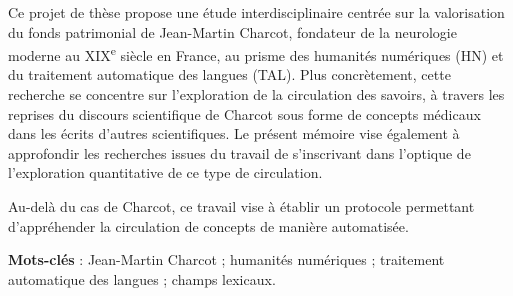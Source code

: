 
%

Ce projet de thèse propose une étude interdisciplinaire centrée sur la valorisation du fonds patrimonial de Jean-Martin Charcot, fondateur de la neurologie moderne au XIX\textsuperscript{e} siècle en France, au prisme des humanités numériques (\textsc{HN}) et du traitement automatique des langues (\textsc{TAL}). Plus concrètement, cette recherche se concentre sur l'exploration de la circulation des savoirs, à travers les reprises du discours scientifique de Charcot sous forme de concepts médicaux dans les écrits d'autres scientifiques. Le présent mémoire vise également à approfondir les recherches issues du travail de \citet{petkovic2023circulation} s'inscrivant dans l'optique de l'exploration quantitative de ce type de circulation. 


Au-delà du cas de Charcot, ce travail vise à établir un protocole permettant d'appréhender la circulation de concepts de manière automatisée.

\textbf{Mots-clés} : Jean-Martin Charcot ; humanités numériques ; traitement automatique des langues ; champs lexicaux.

